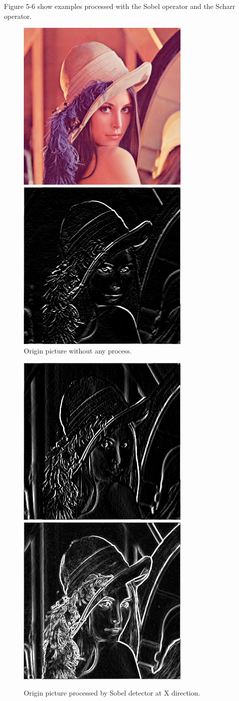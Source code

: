 \documentclass[10pt,twocolumn,letterpaper]{article}
\begin{document}
Figure 5-6 show examples processed with the Sobel operator and the Scharr operator.

\begin{figure}[htp]
	\begin{center}
		\includegraphics[width=.473\linewidth]{../../code/Lenna.jpg} \quad
		\includegraphics[width=.473\linewidth]{../../code/lenaSobelX.png} \\ 
		\caption{Origin picture without any process. }
		\caption{Origin picture processed by Sobel detector at X direction. }
		\includegraphics[width=.473\linewidth]{../../code/lenaSobelY.png} \quad
		\includegraphics[width=.473\linewidth]{../../code/lenaSobel.png}	

\end{center}
\end{figure}
\end{document}

